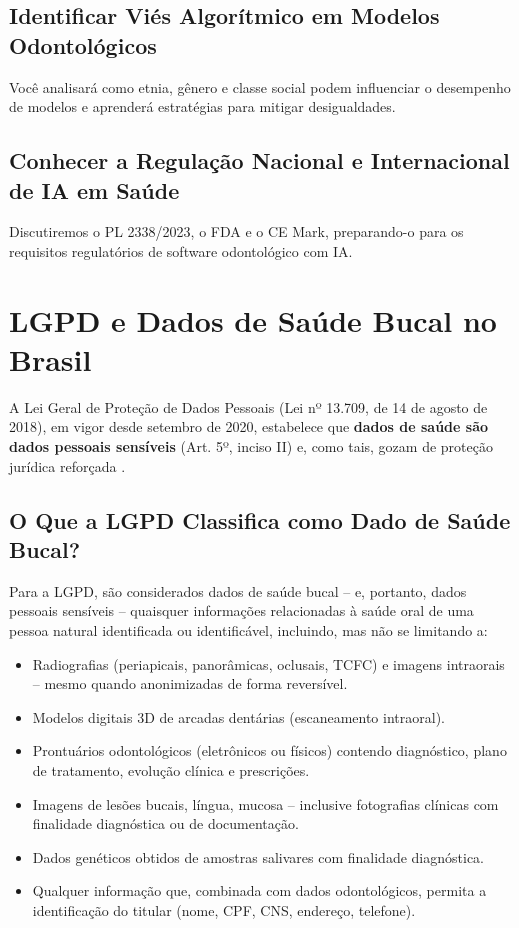 \subsection{Identificar Viés Algorítmico em Modelos Odontológicos}
Você analisará como etnia, gênero e classe social podem influenciar o desempenho de modelos e aprenderá estratégias para mitigar desigualdades.

\subsection{Conhecer a Regulação Nacional e Internacional de IA em Saúde}
Discutiremos o PL 2338/2023, o FDA e o CE Mark, preparando-o para os requisitos regulatórios de software odontológico com IA.

\section{LGPD e Dados de Saúde Bucal no Brasil}
\label{sec:lgpd-saude-bucal}

\nivelquatro

A Lei Geral de Proteção de Dados Pessoais (Lei nº 13.709, de 14 de agosto de
2018), em vigor desde setembro de 2020, estabelece que \textbf{dados de saúde
são dados pessoais sensíveis} (Art. 5º, inciso II) e, como tais, gozam de
proteção jurídica reforçada \cite{brasil2018lgpd}.


\subsection{O Que a LGPD Classifica como Dado de Saúde Bucal?}

Para a LGPD, são considerados dados de saúde bucal -- e, portanto, dados
pessoais sensíveis -- quaisquer informações relacionadas à saúde oral de uma
pessoa natural identificada ou identificável, incluindo, mas não se limitando a:

\begin{itemize}
  \item Radiografias (periapicais, panorâmicas, oclusais, TCFC) e imagens
    intraorais -- mesmo quando anonimizadas de forma reversível.
  \item Modelos digitais 3D de arcadas dentárias (escaneamento intraoral).
  \item Prontuários odontológicos (eletrônicos ou físicos) contendo diagnóstico,
    plano de tratamento, evolução clínica e prescrições.
  \item Imagens de lesões bucais, língua, mucosa -- inclusive fotografias
    clínicas com finalidade diagnóstica ou de documentação.
  \item Dados genéticos obtidos de amostras salivares com finalidade diagnóstica.
  \item Qualquer informação que, combinada com dados odontológicos, permita a
    identificação do titular (nome, CPF, CNS, endereço, telefone).
\end{itemize}

